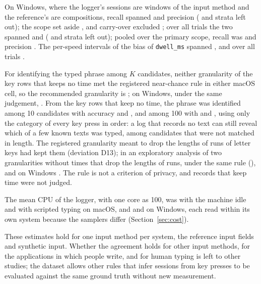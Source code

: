 On Windows, where the logger's sessions are windows of the input method and the reference's are compositions, recall
spanned  and precision 
( and  strata left
out); the scope set aside , and carry-over excluded
; over all trials the two spanned  and
 ( and
 strata left out); pooled over the primary scope, recall was
 and precision
. The per-speed intervals of the bias of \texttt{dwell\_ms}
spanned , and over all trials .

For identifying the typed phrase among $K$ candidates, neither granularity of the key rows that keeps no time met the
registered near-chance rule in either macOS cell, so the recommended granularity is ; on Windows,
under the same judgement, . From the key rows that keep no time, the phrase was identified
among 10 candidates with accuracy  and
, and among 100 with 
and , using only the category of every key press in order: a log
that records no text can still reveal which of a few known texts was typed, among candidates that were not matched in
length. The registered granularity meant to drop the lengths of runs of letter keys had kept them (deviation D13); in an
exploratory analysis of two granularities without times that drop the lengths of runs,  under the
same rule (), and on Windows . The rule is
not a criterion of privacy, and
records that keep time were not judged.

The mean CPU of the logger, with one core as 100, was  with the machine idle and
 with scripted typing on macOS, and  and
 on Windows, each read within its own system because the samplers differ
(Section~\ref{sec:cost}).

These estimates hold for one input method per system, the reference input fields and synthetic input. Whether the
agreement holds for other input methods, for the applications in which people write, and for human typing is left to
other studies; the dataset allows other rules that infer sessions from key presses to be evaluated against the same
ground truth without new measurement.
